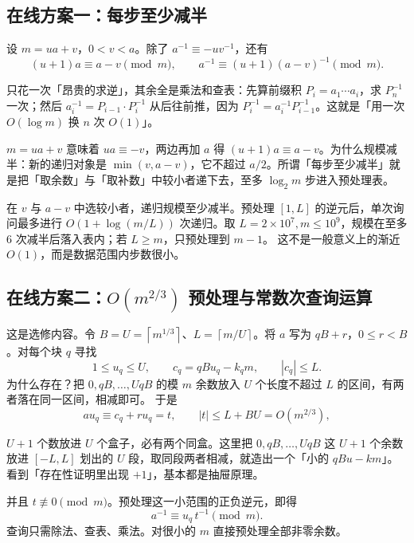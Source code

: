 \documentclass[UTF8,a4paper,11pt,twoside,openright,fontset=fandol]{ctexbook}
\theoremstyle{definition}
\newcommand{\ceil}[1]{\left\lceil #1\right\rceil}
\begin{document}
\subsection{在线方案一：每步至少减半}
设 $m=ua+v$，$0<v<a$。除了 $a^{-1}\equiv-u v^{-1}$，还有
\[
 (u+1)a\equiv a-v\pmod m,
 \qquad a^{-1}\equiv(u+1)(a-v)^{-1}\pmod m.
\]

\begin{tip}[前缀积批量求逆元的想法]
只花一次「昂贵的求逆」，其余全是乘法和查表：先算前缀积 $P_i=a_1\cdots a_i$，求 $P_n^{-1}$ 一次；然后 $a_i^{-1}=P_{i-1}\cdot P_i^{-1}$ 从后往前推，因为 $P_i^{-1}=a_i^{-1}P_{i-1}^{-1}$。这就是「用一次 $O(\log m)$ 换 $n$ 次 $O(1)$」。
\end{tip}

\begin{tip}[这个恒等式从哪来]
$m=ua+v$ 意味着 $ua\equiv-v$，两边再加 $a$ 得 $(u+1)a\equiv a-v$。为什么规模减半：新的递归对象是 $\min(v,a-v)$，它不超过 $a/2$。所谓「每步至少减半」就是把「取余数」与「取补数」中较小者递下去，至多 $\log_2 m$ 步进入预处理表。
\end{tip}

在 $v$ 与 $a-v$ 中选较小者，递归规模至少减半。预处理 $[1,L]$ 的逆元后，单次询问最多进行 $O(1+\log(m/L))$ 次递归。取 $L=2\times10^7,m\le10^9$，规模在至多 $6$ 次减半后落入表内；若 $L\ge m$，只预处理到 $m-1$。
这不是一般意义上的渐近 $O(1)$，而是数据范围内步数很小。

\subsection{在线方案二：\texorpdfstring{$O(m^{2/3})$}{O(m2/3)} 预处理与常数次查询运算}
这是选修内容。令 $B=U=\ceil{m^{1/3}}$、$L=\ceil{m/U}$。将 $a$ 写为 $qB+r$，$0\le r<B$。对每个块 $q$ 寻找
\[
1\le u_q\le U,\qquad c_q=qBu_q-k_qm,\qquad |c_q|\le L.
\]
为什么存在？把 $0,qB,\ldots,UqB$ 的模 $m$ 余数放入 $U$ 个长度不超过 $L$ 的区间，有两者落在同一区间，相减即可。
于是
\[
 a u_q\equiv c_q+ru_q=t,\qquad |t|\le L+BU=O(m^{2/3}),
\]

\begin{tip}[抽屉原理一句话]
$U+1$ 个数放进 $U$ 个盒子，必有两个同盒。这里把 $0,qB,\ldots,UqB$ 这 $U+1$ 个余数放进 $[-L,L]$ 划出的 $U$ 段，取同段两者相减，就造出一个「小的 $qBu-km$」。看到「存在性证明里出现 $+1$」，基本都是抽屉原理。
\end{tip}

并且 $t\not\equiv0\pmod m$。预处理这一小范围的正负逆元，即得
\[
 a^{-1}\equiv u_q\,t^{-1}\pmod m.
\]
查询只需除法、查表、乘法。对很小的 $m$ 直接预处理全部非零余数。
\end{document}
